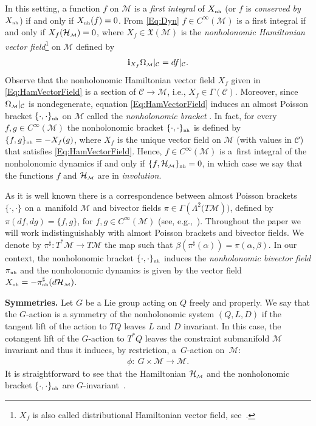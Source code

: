 \documentclass[pdftex]{sigma}
\numberwithin{equation}{section}
\def\M{\mathcal{M}}
\def\C{\mathcal{C}}
\def\Ham{\mathcal{H}}
\def\nh{{\mbox{\tiny{nh}}}}
\def\subM{{\mbox{\tiny{$\M$}}}}
\begin{document}
In this setting, a function $f$ on $\M$ is a {\it first integral} of $X_\nh$ (or $f$ is {\it conserved by}
$X_\nh$) if and only if $X_\nh(f) = 0$.  From \eqref{Eq:Dyn} $f \in C^\infty(\M)$ is a f\/irst integral
if and only if $X_f(\Ham_\subM)=0$, where $X_f \in \mathfrak{X}(\M)$ is the
{\it nonholonomic Hamiltonian vector field}\footnote{$X_f$
is also called distributional Hamiltonian vector f\/ield, see~\cite{CushmanBook}.} on $\M$ def\/ined by
\begin{gather}\label{Eq:HamVectorField}
{\bf i}_{X_f} \Omega_\subM |_\C = df |_\C  .
\end{gather}
Observe that the nonholonomic Hamiltonian vector f\/ield $X_f$ given in \eqref{Eq:HamVectorField} is a section of $\C\to \M$, i.e., $X_f \in \Gamma(\C)$.
Moreover, since $\Omega_\subM|_\C$ is nondegenerate, equation \eqref{Eq:HamVectorField}  induces an almost Poisson bracket $\{\cdot, \cdot \}_\nh$ on $\M$ called the {\it nonholonomic bracket} \cite{IbLeMaMa1999,Marle1998, SchaftMaschke1994}.  In fact,  for every $f,g \in C^\infty(\M)$ the nonholonomic bracket $\{\cdot, \cdot \}_\nh$ is def\/ined by  $\{f,g\}_\nh = -X_f(g)$, where $X_f$ is the unique vector f\/ield on $\M$ (with values in $\C$) that satisf\/ies \eqref{Eq:HamVectorField}. Hence, $f\in C^\infty(\M)$ is a~f\/irst integral of the nonholonomic dynamics if and only if $\{f,\Ham_\subM\}_\nh = 0$, in which case we say that the functions $f$
and $\Ham_\subM$ are in {\it involution}.

As it is well known there is a correspondence between
almost Poisson brackets $\{\cdot,\cdot\}$ on a~mani\-fold $\M$ and bivector f\/ields
$\pi\in\Gamma\left( \Lambda^2 (T\M\right))$, def\/ined by $\pi(df,dg) = \{f,g\}$,
for $f,g\in C^{\infty}(\M)$  (see, e.g.,~\cite{MarsdenRatiuBook}). Throughout the paper we will work indistinguishably with almost
Poisson brackets and bivector f\/ields. We denote by $\pi^\sharp\colon T^*\M\longrightarrow T\M$ the map
such that $\beta(\pi^\sharp(\alpha)) = \pi(\alpha,\beta)$.
In our context, the nonholonomic bracket $\{\cdot,\cdot\}_\nh$ induces the
{\it nonholonomic bivector field} $\pi_\nh$ and the nonholonomic dynamics is
given by the vector f\/ield $X_\nh = - \pi^\sharp_\nh(d\Ham_\subM)$.

{\bf Symmetries.}
Let $G$ be a Lie group acting on $Q$ freely and properly.  We say that the $G$-action is a symmetry
of the nonholonomic system $(Q,L,D)$ if the tangent lift of the action to $TQ$ leaves
$L$ and $D$ invariant.  In this case, the cotangent lift of the $G$-action to $T^*Q$
leaves the constraint submanifold $\M$ invariant  and thus it induces, by restriction, a~$G$-action on~$\M$:
\begin{gather*}
\phi\colon \ G \times \M \to \M.
\end{gather*}
It is straightforward to see that the Hamiltonian $\Ham_\subM$ and the nonholonomic
bracket $\{\cdot, \cdot \}_\nh$ are $G$-invariant~\cite{IbLeMaMa1999,Marle1998}.
\end{document}
